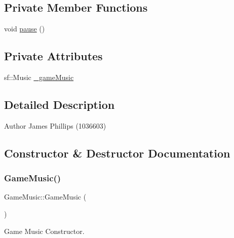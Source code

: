 \subsection*{Private Member Functions}
\begin{DoxyCompactItemize}
\item 
void \hyperlink{class_game_music_a763d190d8727abe9eb47acddc5cf0008}{pause} ()
\end{DoxyCompactItemize}
\subsection*{Private Attributes}
\begin{DoxyCompactItemize}
\item 
sf\+::\+Music \hyperlink{class_game_music_a461fff6d2be45f65c7de7fdadcf0ae00}{\+\_\+game\+Music}
\end{DoxyCompactItemize}


\subsection{Detailed Description}
\begin{DoxyAuthor}{Author}
James Phillips (1036603) 
\end{DoxyAuthor}


\subsection{Constructor \& Destructor Documentation}
\mbox{\label{class_game_music_a3636a483e9a9d86ff5700f4a13662dcb}} 
\subsubsection{\texorpdfstring{Game\+Music()}{GameMusic()}}
{\footnotesize\ttfamily Game\+Music\+::\+Game\+Music (\begin{DoxyParamCaption}{ }\end{DoxyParamCaption})}



Game Music Constructor. 

\mbox{\label{class_game_music_a3ab16e5c895c854c7c1642e5718508f2}} 
